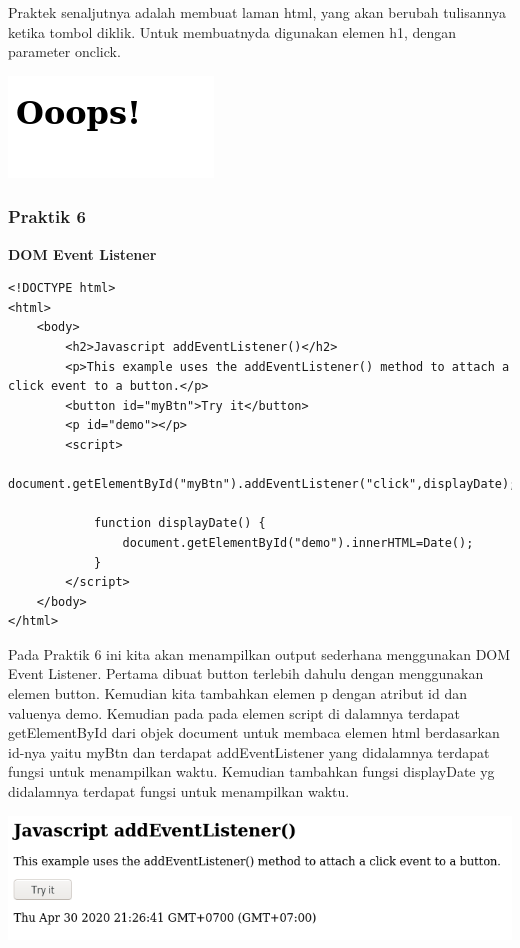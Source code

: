 \documentclass[a4paper,12pt]{article}
\begin{document}
Praktek senaljutnya adalah membuat laman html, yang akan berubah tulisannya ketika tombol diklik. Untuk membuatnyda
digunakan elemen h1, dengan parameter onclick.

\begin{center}
    \includegraphics[scale=.7]{5.png} 
\end{center}

\subsubsection{Praktik 6}
\textbf{DOM Event Listener}
\begin{lstlisting}
<!DOCTYPE html>
<html>
    <body>
        <h2>Javascript addEventListener()</h2>
        <p>This example uses the addEventListener() method to attach a click event to a button.</p>
        <button id="myBtn">Try it</button>
        <p id="demo"></p>
        <script>
            document.getElementById("myBtn").addEventListener("click",displayDate);

            function displayDate() {
                document.getElementById("demo").innerHTML=Date();
            }
        </script>
    </body>
</html>
\end{lstlisting}

Pada Praktik 6 ini kita akan menampilkan output sederhana menggunakan DOM Event Listener. Pertama dibuat button terlebih
dahulu dengan menggunakan elemen button. Kemudian kita tambahkan elemen
p dengan atribut id dan valuenya demo. Kemudian pada pada elemen script di dalamnya
terdapat getElementById dari objek document untuk membaca elemen html berdasarkan id-nya yaitu
myBtn dan terdapat addEventListener yang didalamnya terdapat fungsi untuk menampilkan waktu. Kemudian tambahkan fungsi
displayDate yg didalamnya terdapat fungsi untuk menampilkan waktu.

\begin{center}
    \includegraphics[scale=.7]{6.png} 
\end{center}
\end{document}

